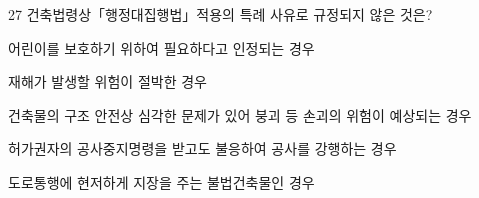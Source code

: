 \begin{question}{27}
건축법령상「행정대집행법」적용의 특례 사유로 규정되지 않은 것은?
\begin{choices}
  \item 어린이를 보호하기 위하여 필요하다고 인정되는 경우
  \item 재해가 발생할 위험이 절박한 경우
  \item 건축물의 구조 안전상 심각한 문제가 있어 붕괴 등 손괴의 위험이 예상되는 경우
  \item 허가권자의 공사중지명령을 받고도 불응하여 공사를 강행하는 경우
  \item 도로통행에 현저하게 지장을 주는 불법건축물인 경우
\end{choices}
\end{question}
